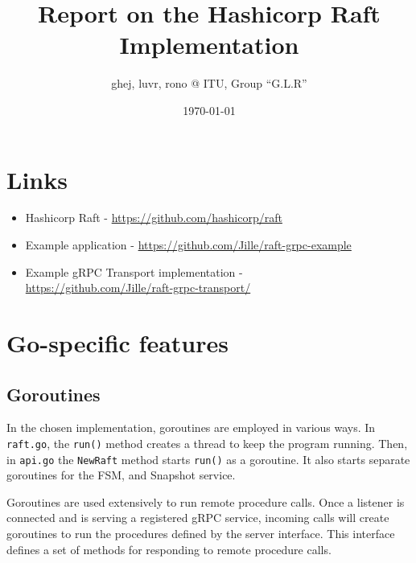\documentclass[a4paper,11pt]{article}
\title{Report on the Hashicorp Raft Implementation}
\author{ghej, luvr, rono @ ITU, Group ``G.L.R''}
\date{\today}
\begin{document}
\maketitle

\tableofcontents

\section*{Links}
\begin{itemize}
\item Hashicorp Raft - \url{https://github.com/hashicorp/raft}
\item Example application - \url{https://github.com/Jille/raft-grpc-example}
\item Example gRPC Transport implementation - \\\url{https://github.com/Jille/raft-grpc-transport/}
\end{itemize}

\pagebreak


\section{Go-specific features}
\subsection{Goroutines}
In the chosen implementation, goroutines are employed in various ways. In \texttt{raft.go}, the \texttt{run()} method creates a thread to keep the program running. Then, in \texttt{api.go} the \texttt{NewRaft} method starts \texttt{run()} as a goroutine. It also starts separate goroutines for the FSM, and Snapshot service.

\bigbreak \noindent Goroutines are used extensively to run remote procedure calls. Once a listener is connected and is serving a registered gRPC service, incoming calls will create goroutines to run the procedures defined by the server interface. This interface defines a set of methods for responding to remote procedure calls. 
\end{document}
